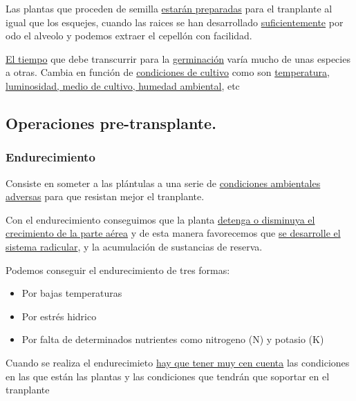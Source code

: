 \documentclass[a4paper,12pt,oneside]{article}
\begin{document}
Las plantas que proceden de semilla \uline{estarán preparadas} para el tranplante al
igual que los esquejes, cuando las raices se han desarrollado \uline{suficientemente}
por odo el alveolo y podemos extraer el cepellón con facilidad. 

\uline{El tiempo} que debe transcurrir para la \uline{germinación} varía mucho de unas
especies a otras. Cambia en función de \uline{condiciones de cultivo} como son
\uline{temperatura, luminosidad, medio de cultivo, humedad ambiental}, etc
\subsection{Operaciones pre-transplante.}
\label{sec:orgef7362e}
\subsubsection{Endurecimiento}
\label{sec:orgd89021a}
Consiste en someter a las plántulas a una serie de \uline{condiciones ambientales
adversas} para que resistan  mejor el tranplante.

Con el  endurecimiento conseguimos que la planta \uline{detenga o disminuya el
crecimiento de la parte aérea} y de esta manera favorecemos que \uline{se desarrolle
el sistema radicular}, y la acumulación de sustancias de reserva. 

Podemos conseguir el endurecimiento de tres formas:
\begin{itemize}
\item Por bajas temperaturas
\item Por estrés hidrico
\item Por falta de determinados nutrientes como nitrogeno (N) y potasio (K)
\end{itemize}

Cuando se realiza el endurecimieto \uline{hay que tener muy cen cuenta} las
condiciones en las que están las plantas y las condiciones que tendrán que
soportar en el tranplante
\end{document}
